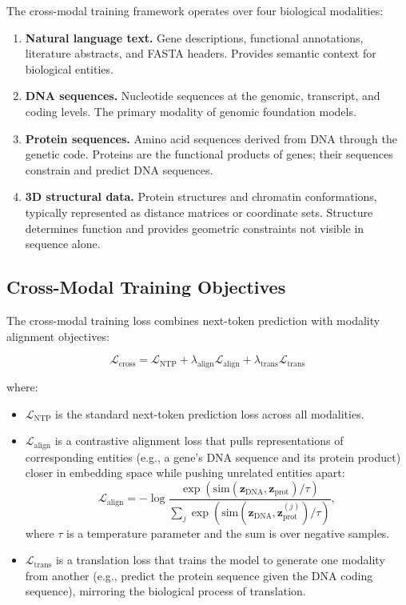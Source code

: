 The cross-modal training framework operates over four biological modalities:

\begin{enumerate}[leftmargin=1.8em]
  \item \textbf{Natural language text.} Gene descriptions, functional annotations, literature abstracts, and FASTA headers. Provides semantic context for biological entities.

  \item \textbf{DNA sequences.} Nucleotide sequences at the genomic, transcript, and coding levels. The primary modality of genomic foundation models.

  \item \textbf{Protein sequences.} Amino acid sequences derived from DNA through the genetic code. Proteins are the functional products of genes; their sequences constrain and predict DNA sequences.

  \item \textbf{3D structural data.} Protein structures and chromatin conformations, typically represented as distance matrices or coordinate sets. Structure determines function and provides geometric constraints not visible in sequence alone.
\end{enumerate}

\subsection{Cross-Modal Training Objectives}

The cross-modal training loss combines next-token prediction with modality alignment objectives:

\begin{equation}
\boxed{
\mathcal{L}_{\text{cross}} = \mathcal{L}_{\text{NTP}} + \lambda_{\text{align}} \mathcal{L}_{\text{align}} + \lambda_{\text{trans}} \mathcal{L}_{\text{trans}}
}
\label{eq:cross-modal-loss}
\end{equation}

\noindent
where:
\begin{itemize}[leftmargin=1.5em]
  \item $\mathcal{L}_{\text{NTP}}$ is the standard next-token prediction loss across all modalities.
  \item $\mathcal{L}_{\text{align}}$ is a contrastive alignment loss that pulls representations of corresponding entities (e.g., a gene's DNA sequence and its protein product) closer in embedding space while pushing unrelated entities apart:
  \begin{equation}
  \mathcal{L}_{\text{align}} = -\log \frac{\exp(\text{sim}(\mathbf{z}_{\text{DNA}}, \mathbf{z}_{\text{prot}}) / \tau)}{\sum_{j} \exp(\text{sim}(\mathbf{z}_{\text{DNA}}, \mathbf{z}_{\text{prot}}^{(j)}) / \tau)},
  \end{equation}
  where $\tau$ is a temperature parameter and the sum is over negative samples.
  \item $\mathcal{L}_{\text{trans}}$ is a translation loss that trains the model to generate one modality from another (e.g., predict the protein sequence given the DNA coding sequence), mirroring the biological process of translation.
\end{itemize}

